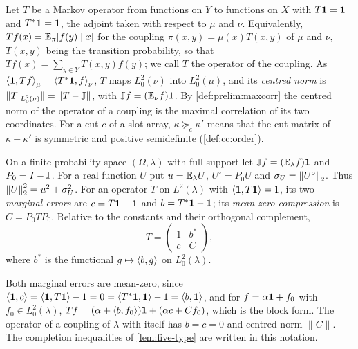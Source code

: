 Let $T$ be a Markov operator from functions on $Y$ to functions on $X$ with
$T\mathbf 1=\mathbf 1$ and $T^*\mathbf 1=\mathbf 1$, the adjoint taken with respect to $\mu$ and
$\nu$. Equivalently, $Tf(x)=\mathbb E_\pi[f(y)\mid x]$ for the coupling
$\pi(x,y)=\mu(x)T(x,y)$ of $\mu$ and $\nu$, $T(x,y)$ being the transition
probability, so that $Tf(x)=\sum_{y\in Y}T(x,y)f(y)$; we call $T$ the operator of the coupling. As
$\left\langle \mathbf 1,Tf\right\rangle_\mu=\left\langle T^*\mathbf 1,f\right\rangle_\nu$, $T$ maps $L^2_0(\nu)$ into $L^2_0(\mu)$,
and its \emph{centred norm} is $\|T|_{L^2_0(\nu)}\|=\|T-\mathbb J\|$, with
$\mathbb J f=(\mathbb E_\nu f)\mathbf 1$. By \cref{def:prelim:maxcorr} the centred norm of the
operator of a coupling is the maximal correlation of its two coordinates. For a
cut $c$ of a slot array, $\kappa\succeq_c\kappa'$ means that the cut matrix of
$\kappa-\kappa'$ is symmetric and positive semidefinite (\cref{def:cc:order}).

\begin{definition}\label{def:split:notation}
On a finite probability space $(\Omega,\lambda)$ with full support let
$\mathbb J f=(\mathbb E_\lambda f)\mathbf 1$ and $P_0=I-\mathbb J$. For a real function $U$ put
$u=\mathbb E_\lambda U$, $U^\circ=P_0U$ and $\sigma_U=\left\|U^\circ\right\|_2$. Thus
$\left\|U\right\|_2^2=u^2+\sigma_U^2$. For an operator $T$ on $L^2(\lambda)$ with
$\left\langle \mathbf 1,T\mathbf 1\right\rangle=1$, its two \emph{marginal errors} are $c=T\mathbf 1-\mathbf 1$ and
$b=T^*\mathbf 1-\mathbf 1$; its \emph{mean-zero compression} is $C=P_0TP_0$. Relative to
the constants and their orthogonal complement,
\[
 T=\begin{pmatrix}1&b^*\\c&C\end{pmatrix},
\]
where $b^*$ is the functional $g\mapsto\left\langle b,g\right\rangle$ on $L^2_0(\lambda)$.
\end{definition}

Both marginal errors are mean-zero, since
$\left\langle \mathbf 1,c\right\rangle=\left\langle \mathbf 1,T\mathbf 1\right\rangle-1=0=\left\langle T^*\mathbf 1,\mathbf 1\right\rangle-1=\left\langle b,\mathbf 1\right\rangle$, and for
$f=\alpha\mathbf 1+f_0$ with $f_0\in L^2_0(\lambda)$,
$Tf=(\alpha+\left\langle b,f_0\right\rangle)\mathbf 1+(\alpha c+Cf_0)$, which is the block form. The
operator of a coupling of $\lambda$ with itself has $b=c=0$ and centred norm
$\|C\|$. The completion inequalities of \cref{lem:five-type} are written in
this notation.

